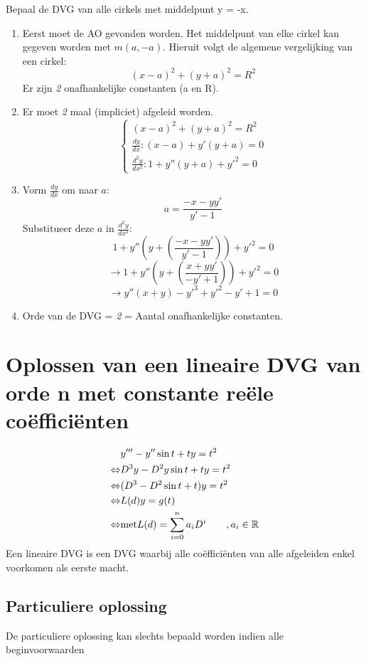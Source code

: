 {
Bepaal de DVG van alle cirkels met middelpunt y = -x.
\begin{enumerate}
\item Eerst moet de AO gevonden worden. Het middelpunt van elke cirkel kan gegeven worden met $m(a, -a).$
    Hieruit volgt de algemene vergelijking van een cirkel: $$(x - a)^2 + (y + a)^2 = R^2$$
    Er zijn \textit{2} onafhankelijke constanten (a en R).
\item Er moet \textit{2} maal (impliciet) afgeleid worden.
\[
    \begin{cases}
    (x - a)^2 + (y + a)^2 = R^2 \\
    \frac{dy}{dx} : (x-a) + y'(y+a) = 0 \\
    \frac{d^2y}{dx^2} : 1 + y''(y + a) + y'^2 = 0
    \end{cases}
\]
\item
    Vorm $\frac{dy}{dx}$ om naar $a$:
    $$a = \frac{-x - yy'}{y' - 1}$$
    Substitueer deze $a$ in $\frac{d^2y}{dx^2}$:
    $$1 + y''(y + (\frac{-x - yy'}{y' - 1})) + y'^2 = 0$$
    $$\rightarrow 1 + y''(y + (\frac{x + yy'}{-y' + 1})) + y'^2 = 0$$
    $$\rightarrow y''(x + y) - y'^3 + y'^2 - y' + 1 = 0$$
\item Orde van de DVG = \textit{2}  = Aantal onafhankelijke constanten.
\end{enumerate}
}
\section{Oplossen van een lineaire DVG van orde n met constante reële coëfficiënten}
\begin{equation*}
 \begin{split}
		  & y''' - y''\sin t + ty = t^2 \\
  \Leftrightarrow & D^3y - D^2y\sin t + ty = t^2 \\
  \Leftrightarrow & (D^3 - D^2\sin t + t)y = t^2 \\
  \Leftrightarrow & L(d)y = g(t) \\
  \Leftrightarrow & \hbox{met} L(d) = \sum_{i = 0}^{n} a_iD^i \qquad ,a_i \in \mathbb{R}
 \end{split}
\end{equation*}
Een lineaire DVG is een DVG waarbij alle coëfficiënten van alle afgeleiden enkel voorkomen als eerste macht.
\subsection{Particuliere oplossing}
De particuliere oplossing kan slechts bepaald worden indien alle beginvoorwaarden 

